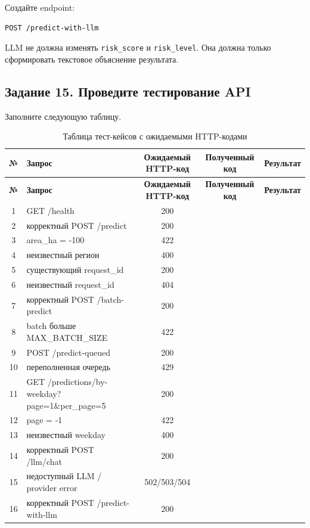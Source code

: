 \documentclass[12pt,a4paper]{article}
\begin{document}
Создайте endpoint:

\begin{lstlisting}[caption={Endpoint /predict-with-llm}]
POST /predict-with-llm
\end{lstlisting}

LLM не должна изменять \texttt{risk\_score} и \texttt{risk\_level}. Она должна только сформировать текстовое объяснение результата.

\subsection{Задание 15. Проведите тестирование API}

Заполните следующую таблицу.

\begin{longtable}{|c|p{5.2cm}|c|c|c|}
\caption{Таблица тест-кейсов с ожидаемыми HTTP-кодами}
\label{tab:test_cases}\\
\hline
\textbf{№} & \textbf{Запрос} & \textbf{Ожидаемый HTTP-код} & \textbf{Полученный код} & \textbf{Результат} \\
\hline
\endfirsthead
\hline
\textbf{№} & \textbf{Запрос} & \textbf{Ожидаемый HTTP-код} & \textbf{Полученный код} & \textbf{Результат} \\
\hline
\endhead
1  & GET /health & 200 & & \\
2  & корректный POST /predict & 200 & & \\
3  & area\_ha = -100 & 422 & & \\
4  & неизвестный регион & 400 & & \\
5  & существующий request\_id & 200 & & \\
6  & неизвестный request\_id & 404 & & \\
7  & корректный POST /batch-predict & 200 & & \\
8  & batch больше MAX\_BATCH\_SIZE & 422 & & \\
9  & POST /predict-queued & 200 & & \\
10 & переполненная очередь & 429 & & \\
11 & GET /predictions/by-weekday?page=1\&per\_page=5 & 200 & & \\
12 & page = -1 & 422 & & \\
13 & неизвестный weekday & 400 & & \\
14 & корректный POST /llm/chat & 200 & & \\
15 & недоступный LLM / provider error & 502/503/504 & & \\
16 & корректный POST /predict-with-llm & 200 & & \\
\hline
\end{longtable}
\end{document}
